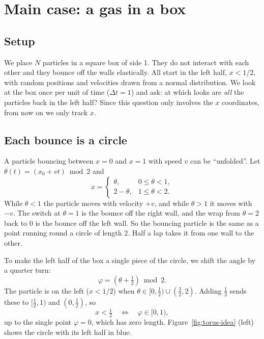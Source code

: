 \documentclass[11pt,a4paper]{article}
\theoremstyle{definition}
\begin{document}
\section{Main case: a gas in a box}
\label{sec:gas}

\subsection{Setup}

We place $N$ particles in a square box of side 1. They do not interact with each other and they bounce off the walls elastically. All start in the left half, $x < 1/2$, with random positions and velocities drawn from a normal distribution. We look at the box once per unit of time ($\Delta t = 1$) and ask: at which looks are \emph{all} the particles back in the left half? Since this question only involves the $x$ coordinates, from now on we only track $x$.

\subsection{Each bounce is a circle}
\label{sec:unfold}

A particle bouncing between $x=0$ and $x=1$ with speed $v$ can be ``unfolded''. Let $\theta(t) = (x_0 + v t) \bmod 2$ and
\[
x = \begin{cases} \theta, & 0 \le \theta < 1, \\ 2 - \theta, & 1 \le \theta < 2. \end{cases}
\]
While $\theta < 1$ the particle moves with velocity $+v$, and while $\theta > 1$ it moves with $-v$. The switch at $\theta = 1$ is the bounce off the right wall, and the wrap from $\theta = 2$ back to $0$ is the bounce off the left wall. So the bouncing particle is the same as a point running round a circle of length 2. Half a lap takes it from one wall to the other.

To make the left half of the box a single piece of the circle, we shift the angle by a quarter turn:
\[
\varphi = \left(\theta + \tfrac12\right) \bmod 2 .
\]
The particle is on the left ($x < 1/2$) when $\theta \in [0, \tfrac12) \cup (\tfrac32, 2)$. Adding $\tfrac12$ sends these to $[\tfrac12, 1)$ and $(0, \tfrac12)$, so
\[
x < \tfrac12 \quad\Longleftrightarrow\quad \varphi \in [0, 1) ,
\]
up to the single point $\varphi = 0$, which has zero length. Figure~\ref{fig:torus-idea} (left) shows the circle with its left half in blue.
\end{document}
